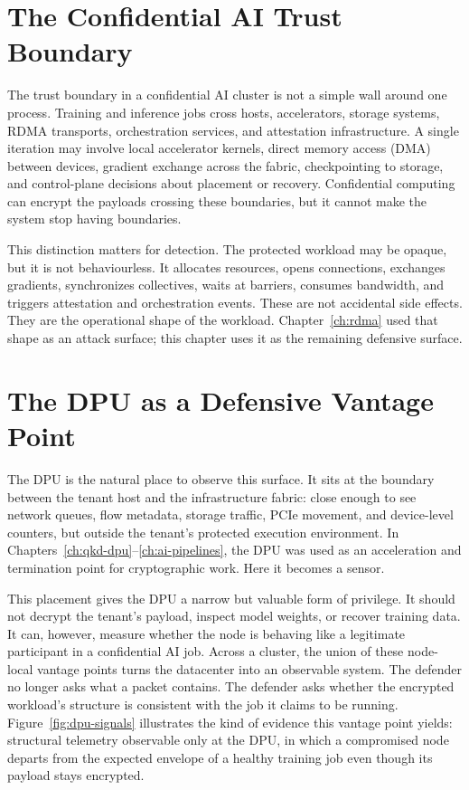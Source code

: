 \section{The Confidential AI Trust Boundary}
\label{sec:conf-trust-boundary}

The trust boundary in a confidential AI cluster is not a simple wall around one process. Training and inference jobs cross hosts, accelerators, storage systems, RDMA transports, orchestration services, and attestation infrastructure. A single iteration may involve local accelerator kernels, direct memory access (DMA) between devices, gradient exchange across the fabric, checkpointing to storage, and control-plane decisions about placement or recovery. Confidential computing can encrypt the payloads crossing these boundaries, but it cannot make the system stop having boundaries.

This distinction matters for detection. The protected workload may be opaque, but it is not behaviourless. It allocates resources, opens connections, exchanges gradients, synchronizes collectives, waits at barriers, consumes bandwidth, and triggers attestation and orchestration events. These are not accidental side effects. They are the operational shape of the workload. Chapter~\ref{ch:rdma} used that shape as an attack surface; this chapter uses it as the remaining defensive surface.

\section{The DPU as a Defensive Vantage Point}
\label{sec:conf-observable}

The DPU is the natural place to observe this surface. It sits at the boundary between the tenant host and the infrastructure fabric: close enough to see network queues, flow metadata, storage traffic, PCIe movement, and device-level counters, but outside the tenant's protected execution environment. In Chapters~\ref{ch:qkd-dpu}--\ref{ch:ai-pipelines}, the DPU was used as an acceleration and termination point for cryptographic work. Here it becomes a sensor.

This placement gives the DPU a narrow but valuable form of privilege. It should not decrypt the tenant's payload, inspect model weights, or recover training data. It can, however, measure whether the node is behaving like a legitimate participant in a confidential AI job. Across a cluster, the union of these node-local vantage points turns the datacenter into an observable system. The defender no longer asks what a packet contains. The defender asks whether the encrypted workload's structure is consistent with the job it claims to be running. Figure~\ref{fig:dpu-signals} illustrates the kind of evidence this vantage point yields: structural telemetry observable only at the DPU, in which a compromised node departs from the expected envelope of a healthy training job even though its payload stays encrypted.

